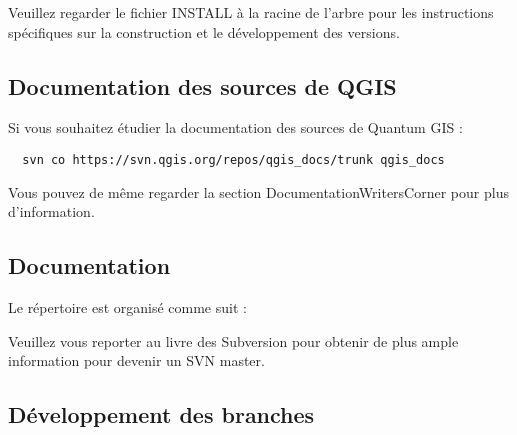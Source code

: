 Veuillez regarder le fichier INSTALL à la racine de l'arbre pour les instructions spécifiques sur la construction et le développement des versions.

\subsection{Documentation des sources de QGIS}

Si vous souhaitez étudier la documentation des sources de Quantum GIS :

\begin{verbatim}
  svn co https://svn.qgis.org/repos/qgis_docs/trunk qgis_docs
\end{verbatim}

Vous pouvez de même regarder la section \og{}DocumentationWritersCorner\fg{} pour plus d'information.

\subsection{Documentation}
Le répertoire est organisé comme suit :


Veuillez vous reporter au livre des Subversion  pour obtenir de plus ample information pour devenir un SVN master.


\subsection{Développement des branches}

